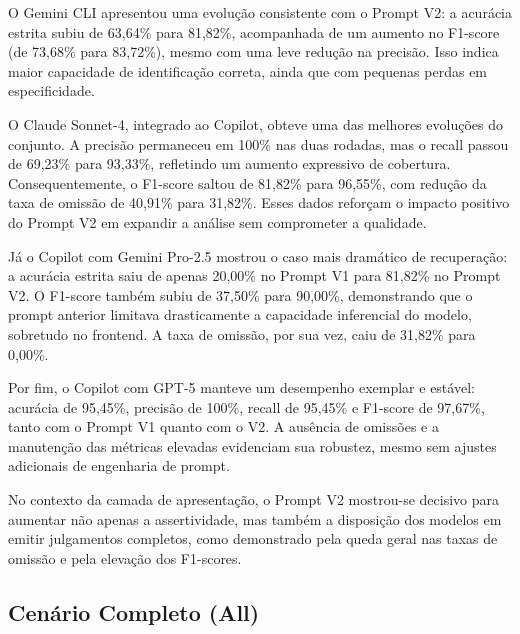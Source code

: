 O Gemini CLI apresentou uma evolução consistente com o Prompt V2: a acurácia estrita subiu de 63,64\% para 81,82\%, acompanhada de um aumento no F1-score (de 73,68\% para 83,72\%), mesmo com uma leve redução na precisão. Isso indica maior capacidade de identificação correta, ainda que com pequenas perdas em especificidade.

O Claude Sonnet-4, integrado ao Copilot, obteve uma das melhores evoluções do conjunto. A precisão permaneceu em 100\% nas duas rodadas, mas o recall passou de 69,23\% para 93,33\%, refletindo um aumento expressivo de cobertura. Consequentemente, o F1-score saltou de 81,82\% para 96,55\%, com redução da taxa de omissão de 40,91\% para 31,82\%. Esses dados reforçam o impacto positivo do Prompt V2 em expandir a análise sem comprometer a qualidade.

Já o Copilot com Gemini Pro-2.5 mostrou o caso mais dramático de recuperação: a acurácia estrita saiu de apenas 20,00\% no Prompt V1 para 81,82\% no Prompt V2. O F1-score também subiu de 37,50\% para 90,00\%, demonstrando que o prompt anterior limitava drasticamente a capacidade inferencial do modelo, sobretudo no frontend. A taxa de omissão, por sua vez, caiu de 31,82\% para 0,00\%.

Por fim, o Copilot com GPT-5 manteve um desempenho exemplar e estável: acurácia de 95,45\%, precisão de 100\%, recall de 95,45\% e F1-score de 97,67\%, tanto com o Prompt V1 quanto com o V2. A ausência de omissões e a manutenção das métricas elevadas evidenciam sua robustez, mesmo sem ajustes adicionais de engenharia de prompt.

No contexto da camada de apresentação, o Prompt V2 mostrou-se decisivo para aumentar não apenas a assertividade, mas também a disposição dos modelos em emitir julgamentos completos, como demonstrado pela queda geral nas taxas de omissão e pela elevação dos F1-scores.


\subsection{Cenário Completo (All)}

